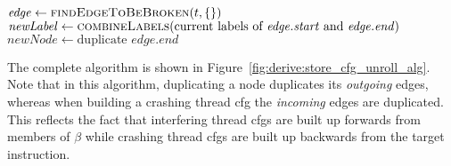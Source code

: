 \begin{sanefig}
\begin{algorithmic}
       \State $\mathit{edge} \gets \textsc{findEdgeToBeBroken}(t, \{\})$
       \State $\mathit{newLabel} \gets \textsc{combineLabels}(\text{current labels of } \mathit{edge}.\mathit{start} \text{ and } \mathit{edge}.\mathit{end})$
       \Else
           \State $\mathit{newNode} \gets \text{duplicate } \mathit{edge}.\mathit{end}$
           \EndFor
       \EndIf
    \EndWhile
  \EndFor
\end{algorithmic}
\vspace{-6pt}
\caption{Loop unrolling algorithm for interfering thread CFGs.
  \textsc{findEdgeToBeBroken} and \textsc{combineLabels} are described
  in the text.}
\label{fig:derive:store_cfg_unroll_alg}
\end{sanefig}

The complete algorithm is shown in
Figure~\ref{fig:derive:store_cfg_unroll_alg}.  Note that in this
algorithm, duplicating a node duplicates its \emph{outgoing} edges,
whereas when building a crashing thread \gls{cfg} the \emph{incoming}
edges are duplicated.  This reflects the fact that interfering thread
\glspl{cfg} are built up forwards from members of $\beta$ while
crashing thread \glspl{cfg} are built up backwards from the target
instruction.

